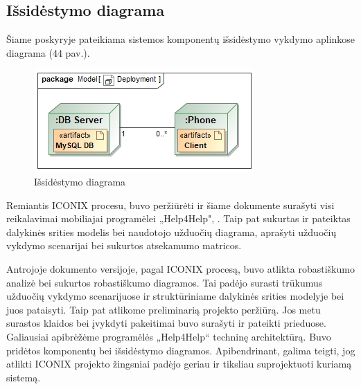 \documentclass{VUMIFPSbakalaurinis}
\begin{document}
\subsection{Išsidėstymo diagrama}
Šiame poskyryje pateikiama sistemos komponentų išsidėstymo vykdymo aplinkose diagrama (44 pav.).
\begin{figure}[h]
	\centering
	\includegraphics[scale=0.7]{img/Deployment}
	\caption{Išsidėstymo diagrama}
	\label{img:deployment}
\end{figure}

Remiantis ICONIX procesu, buvo peržiūrėti ir šiame dokumente surašyti visi reikalavimai mobiliajai programėlei „Help4Help", . Taip pat sukurtas ir pateiktas dalykinės srities modelis bei naudotojo užduočių diagrama, aprašyti užduočių vykdymo scenarijai bei sukurtos atsekamumo matricos.
\par Antrojoje dokumento versijoje, pagal ICONIX procesą, buvo atlikta robastiškumo analizė bei sukurtos robastiškumo diagramos. Tai padėjo surasti trūkumus užduočių vykdymo scenarijuose ir struktūriniame dalykinės srities modelyje bei juos pataisyti. Taip pat atlikome preliminarią projekto peržiūrą. Jos metu surastos klaidos bei įvykdyti pakeitimai buvo surašyti ir pateikti prieduose. Galiausiai apibrėžėme programėlės „Help4Help“ techninę architektūrą. Buvo pridėtos komponentų bei išsidėstymo diagramos. Apibendrinant, galima teigti, jog atlikti ICONIX projekto žingsniai padėjo geriau ir tiksliau suprojektuoti kuriamą sistemą.

\printbibliography[heading=bibintoc]  %
\end{document}
